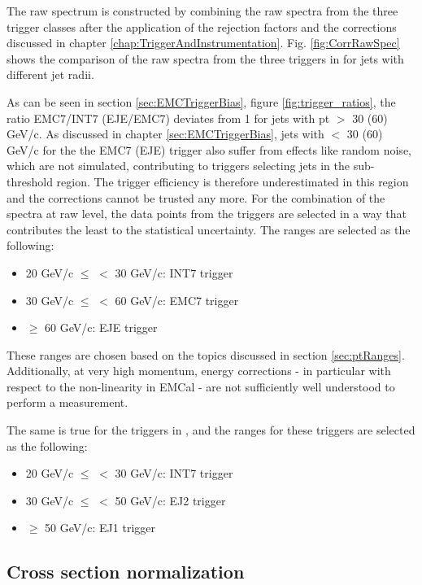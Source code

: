 The raw spectrum is constructed by combining the raw spectra from the three trigger classes after the application of the rejection factors and the corrections discussed in chapter \ref{chap:TriggerAndInstrumentation}. Fig. \ref{fig:CorrRawSpec} shows the comparison of the raw spectra from the three triggers in \pp for jets with different jet radii. 

As can be seen in section \ref{sec:EMCTriggerBias}, figure \ref{fig:trigger_ratios}, the ratio EMC7/INT7 (EJE/EMC7) deviates from 1 for jets with pt $>$ 30 (60) GeV/c. As discussed in chapter \ref{sec:EMCTriggerBias}, jets with \pT $<$ 30 (60) GeV/c for the the EMC7 (EJE) trigger also suffer from effects like random noise, which are not simulated, contributing to triggers selecting jets in the sub-threshold region. The trigger efficiency is therefore underestimated in this \pT region and the corrections cannot be trusted any more. For the combination of the spectra at raw level, the data points from the triggers are selected in a way that contributes the least to the statistical uncertainty. The ranges are selected as the following:

\begin{itemize}
    \item 20 GeV/c $\le$ \pT $<$ 30 GeV/c: INT7 trigger
    \item 30 GeV/c $\le$ \pT $<$ 60 GeV/c: EMC7 trigger
    \item \pT $\ge$ 60 GeV/c: EJE trigger
\end{itemize}

These ranges are chosen based on the topics discussed in section \ref{sec:ptRanges}. Additionally, at very high momentum, energy corrections - in particular with respect to the non-linearity in EMCal - are not sufficiently well understood to perform a measurement.

The same is true for the triggers in \pPb, and the ranges for these triggers are selected as the following:

\begin{itemize}
    \item 20 GeV/c $\le$ \pT $<$ 30 GeV/c: INT7 trigger
    \item 30 GeV/c $\le$ \pT $<$ 50 GeV/c: EJ2 trigger
    \item \pT $\ge$ 50 GeV/c: EJ1 trigger
\end{itemize}

\subsection{Cross section normalization}
\label{sec:xsecNomalization}

